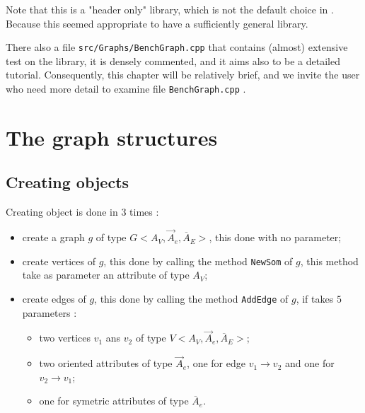 Note that this is a "header only"  library, which is not the default choice in \PPP. Because this seemed
appropriate to have a sufficiently general library.

There also a file {\tt src/Graphs/BenchGraph.cpp} that contains (almost) extensive test on the library,
it is densely commented, and it aims also to be a detailed tutorial. Consequently, this chapter will be relatively
brief, and we invite the user who need more detail to examine file {\tt BenchGraph.cpp} .


\section{The graph structures}


\subsection{Creating objects}

Creating object is done in $3$ times  :

\begin{itemize}
    \item  create a graph $g$ of type  $G<A_V,\vec{A}_e,\overline{A}_E>$, this done
           with no parameter;

    \item  create vertices  of $g$,  this done by calling the method {\tt NewSom} of $g$,
          this method take as parameter an attribute of type $A_V$;

    \item  create edges  of  $g$,  this done by calling the method {\tt AddEdge} of $g$,
           if takes $5$  parameters :

    \begin{itemize}
          \item two vertices $v_1$ ans $v_2$  of type $V<A_V,\vec{A}_e,\overline{A}_E>$;
          \item two oriented attributes of type $\vec{A}_e$, one for edge $v_1 \rightarrow v_2$
                and one for  $v_2 \rightarrow v_1$;
          \item one for symetric attributes of type $\overline{A}_e$.
    \end{itemize}
\end{itemize}

